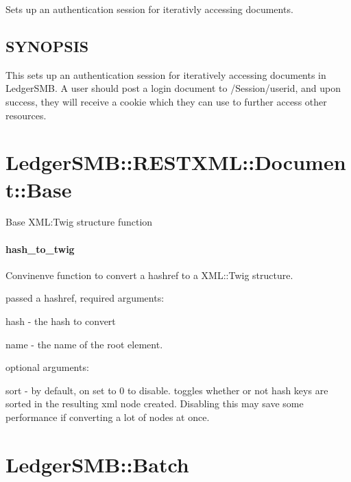 \begin{description}
\begin{description}
\begin{description}
\begin{description}
\begin{description}
\begin{description}
\begin{description}
Sets up an authentication session for iterativly accessing documents.

\subsection*{SYNOPSIS\label{LedgerSMB::RESTXML::Document::Session_SYNOPSIS}}


This sets up an authentication session for iteratively accessing documents in LedgerSMB.  A user should
post a login document to /Session/userid, and upon success, they will receive a cookie which they can use to further
access other resources.

\section{LedgerSMB::RESTXML::Document::Base\label{LedgerSMB::RESTXML::Document::Base}}


Base XML:Twig structure function

\paragraph*{hash\_to\_twig\label{LedgerSMB::RESTXML::Document::Base_hash_to_twig}}


Convinenve function to convert a hashref to a XML::Twig structure.



passed a hashref, required arguments:



hash - the hash to convert



name - the name of the root element.



optional arguments:



sort - by default, on set to 0 to disable.  toggles whether or not hash keys are sorted
in the resulting xml node created.  Disabling this may save some performance if converting a lot of
nodes at once.

\section{LedgerSMB::Batch\label{LedgerSMB::Batch}}



\end{description}
\end{description}
\end{description}
\end{description}
\end{description}
\end{description}
\end{description}
